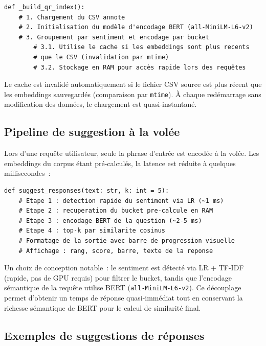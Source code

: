 \documentclass[12pt,a4paper]{report}
\begin{document}
\begin{lstlisting}
def _build_qr_index():
    # 1. Chargement du CSV annote
    # 2. Initialisation du modèle d'encodage BERT (all-MiniLM-L6-v2)
    # 3. Groupement par sentiment et encodage par bucket
        # 3.1. Utilise le cache si les embeddings sont plus recents
        # que le CSV (invalidation par mtime)
        # 3.2. Stockage en RAM pour accès rapide lors des requêtes
\end{lstlisting}

\begin{tip}
Le cache est invalidé automatiquement si le fichier CSV source est plus récent que
les embeddings sauvegardés (comparaison par \texttt{mtime}). À chaque redémarrage
sans modification des données, le chargement est quasi-instantané.
\end{tip}

\subsection{Pipeline de suggestion à la volée}

Lors d'une requête utilisateur, seule la phrase d'entrée est encodée à la volée.
Les embeddings du corpus étant pré-calculés, la latence est réduite à quelques
millisecondes~:

\begin{lstlisting}
def suggest_responses(text: str, k: int = 5):
    # Etape 1 : detection rapide du sentiment via LR (~1 ms)
    # Etape 2 : recuperation du bucket pre-calcule en RAM
    # Etape 3 : encodage BERT de la question (~2-5 ms)
    # Etape 4 : top-k par similarite cosinus
    # Formatage de la sortie avec barre de progression visuelle
    # Affichage : rang, score, barre, texte de la reponse
\end{lstlisting}

\begin{note}
Un choix de conception notable~: le sentiment est détecté via LR + TF-IDF (rapide,
pas de GPU requis) pour filtrer le bucket, tandis que l'encodage sémantique de la
requête utilise BERT (\texttt{all-MiniLM-L6-v2}). Ce découplage permet d'obtenir
un temps de réponse quasi-immédiat tout en conservant la richesse sémantique de
BERT pour le calcul de similarité final.
\end{note}

\pagebreak

\subsection{Exemples de suggestions de réponses}
\end{document}
